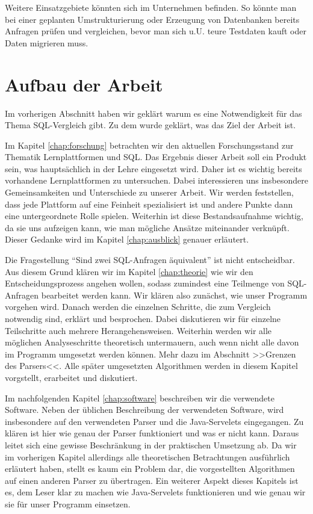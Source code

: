 Weitere Einsatzgebiete könnten sich im Unternehmen befinden. So könnte man bei einer geplanten Umstrukturierung oder Erzeugung von Datenbanken bereits Anfragen prüfen und vergleichen, bevor man sich u.U. teure Testdaten kauft oder Daten migrieren muss.

\section{Aufbau der Arbeit}

Im vorherigen Abschnitt haben wir geklärt warum es eine Notwendigkeit für das Thema SQL-Vergleich gibt. Zu dem wurde geklärt, was das Ziel der Arbeit ist. 

Im Kapitel \ref{chap:forschung} betrachten wir den aktuellen Forschungsstand zur Thematik Lernplattformen und SQL. Das Ergebnis dieser Arbeit soll ein Produkt sein, was hauptsächlich in der Lehre eingesetzt wird. Daher ist es wichtig bereits vorhandene Lernplattformen zu untersuchen. Dabei interessieren uns insbesondere Gemeinsamkeiten und Unterschiede zu unserer Arbeit. Wir werden feststellen, dass jede Plattform auf eine Feinheit spezialisiert ist und andere Punkte dann eine untergeordnete Rolle spielen. Weiterhin ist diese Bestandsaufnahme wichtig, da sie uns aufzeigen kann, wie man mögliche Ansätze miteinander verknüpft. Dieser Gedanke wird im Kapitel \ref{chap:ausblick} genauer erläutert.

Die Fragestellung ``Sind zwei SQL-Anfragen äquivalent'' ist nicht entscheidbar. Aus diesem Grund klären wir im Kapitel \ref{chap:theorie} wie wir den Entscheidungsprozess angehen wollen, sodass zumindest eine Teilmenge von SQL-Anfragen bearbeitet werden kann. Wir klären also zunächst, wie unser Programm vorgehen wird. Danach werden die einzelnen Schritte, die zum Vergleich notwendig sind, erklärt und besprochen. Dabei diskutieren wir für einzelne Teilschritte auch mehrere Herangehensweisen. Weiterhin werden wir alle möglichen Analyseschritte theoretisch untermauern, auch wenn nicht alle davon im Programm umgesetzt werden können. Mehr dazu im Abschnitt >>Grenzen des Parsers<<. Alle später umgesetzten Algorithmen werden in diesem Kapitel vorgstellt, erarbeitet und diskutiert.


Im nachfolgenden Kapitel \ref{chap:software} beschreiben wir die verwendete Software. Neben der üblichen Beschreibung der verwendeten Software, wird insbesondere auf den verwendeten Parser und die Java-Servelets eingegangen. Zu klären ist hier wie genau der Parser funktioniert und was er nicht kann. Daraus leitet sich eine gewisse Beschränkung in der praktischen Umsetzung ab. Da wir im vorherigen Kapitel allerdings alle theoretischen Betrachtungen ausführlich erläutert haben, stellt es kaum ein Problem dar, die vorgestellten Algorithmen auf einen anderen Parser zu übertragen. Ein weiterer Aspekt dieses Kapitels ist es, dem Leser klar zu machen wie Java-Servelets funktionieren und wie genau wir sie für unser Programm einsetzen.

